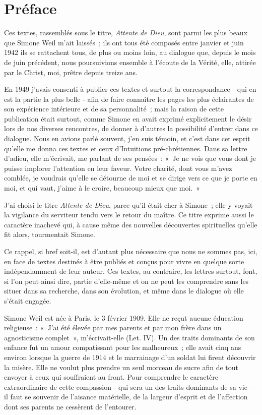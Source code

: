 \documentclass[french,twoside]{book} %
\newcommand{\byline}[1]{\bigskip{\RaggedLeft{#1}\par}\bigskip}
\newcommand\chapteropen{} %
\newcommand\chaptercont{} %
\begin{document}
\chapteropen
\chapter[{Préface}]{Préface}\renewcommand{\leftmark}{Préface}


\byline{Par J.-M. Perrin}

\chaptercont
\noindent Ces textes, rassemblés sous le titre, {\itshape Attente de Dieu}, sont parmi les plus beaux que Simone Weil m'ait laissés ; ils ont tous été composés entre janvier et juin 1942 ils se rattachent tous, de plus ou moins loin, au dialogue que, depuis le mois de juin précédent, nous poursuivions ensemble à l'écoute de la Vérité, elle, attirée par le Christ, moi, prêtre depuis treize ans.\par
En 1949 j'avais consenti à publier ces textes et surtout la correspondance - qui en est la partie la plus belle - afin de faire connaître les pages les plus éclairantes de son expérience intérieure et de sa personnalité ; mais la raison de cette publication était surtout, comme Simone en avait exprimé explicitement le désir lors de nos diverses rencontres, de donner à d'autres la possibilité d'entrer dans ce dialogue. Nous en avions parlé souvent, j'en suis témoin, et c'est dans cet esprit qu'elle me donna ces textes et ceux d'Intuitions pré-chrétiennes. Dans sa lettre d'adieu, elle m'écrivait, me parlant de ses pensées : « Je ne vois que vous dont je puisse implorer l'attention en leur faveur. Votre charité, dont vous m'avez comblée, je voudrais qu'elle se détourne de moi et se dirige vers ce que je porte en moi, et qui vaut, j'aime à le croire, beaucoup mieux que moi. »\par
J'ai choisi le titre {\itshape Attente de Dieu}, parce qu'il était cher à Simone ; elle y voyait la vigilance du serviteur tendu vers le retour du maître. Ce titre exprime aussi le caractère inachevé qui, à cause même des nouvelles découvertes spirituelles qu'elle fit alors, tourmentait Simone.\par
Ce rappel, si bref soit-il, est d'autant plus nécessaire que nous ne sommes pas, ici, en face de textes destinés à être publiés et conçus pour vivre en quelque sorte indépendamment de leur auteur. Ces textes, au contraire, les lettres surtout, font, si l'on peut ainsi dire, partie d'elle-même et on ne peut les comprendre sans les situer dans sa recherche, dans son évolution, et même dans le dialogue où elle s'était engagée.\par
Simone Weil est née à Paris, le 3 février 1909. Elle ne reçut aucune éducation religieuse : « J'ai été élevée par mes parents et par mon frère dans un agnosticisme complet », m'écrivait-elle (Let. IV). Un des traits dominants de son enfance fut un amour compatissant pour les malheureux ; elle avait cinq ans environ lorsque la guerre de 1914 et le marrainage d'un soldat lui firent découvrir la misère. Elle ne voulut plus prendre un seul morceau de sucre afin de tout envoyer à ceux qui souffraient au front. Pour comprendre le caractère extraordinaire de cette compassion - qui sera un des traits dominants de sa vie - il faut se souvenir de l'aisance matérielle, de la largeur d'esprit et de l'affection dont ses parents ne cessèrent de l'entourer.\par
\end{document}

